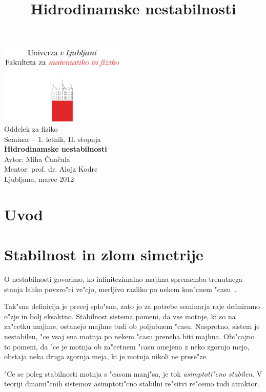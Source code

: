 \documentclass[a4paper,10pt]{article}
\title{Hidrodinamske nestabilnosti}
\begin{document}
\begin{center}
\includegraphics[width=6cm]{../logo_fmf_uni-lj_sl}\\[0.5cm]
Oddelek za fiziko \\[2cm]
{ \large Seminar -- 1. letnik, II. stopnja } \\[1cm]
{ \huge \bf Hidrodinamske nestabilnosti}\\[2cm]
{\large Avtor: Miha \v Can\v cula}\\[0.6cm]
{\large Mentor: prof. dr. Alojz Kodre} \\[0.6cm]
{\large Ljubljana, marec 2012}
\end{center}
\vfill

\begin{abstract}

\end{abstract}

\newpage

\tableofcontents

\section{Uvod}

\section{Stabilnost in zlom simetrije}

O nestabilnosti govorimo, ko infinitezimalno majhna sprememba trenutnega stanja lahko povzro"ci ve"cjo, merljivo razliko po nekem kon"cnem "casu~\cite{drazin}. 

Tak"sna definicija je precej splo"sna, zato jo za potrebe seminarja raje definiramo o"zje in bolj eksaktno. Stabilnost sistema pomeni, da vse motnje, ki so na za"cetku majhne, ostanejo majhne tudi ob poljubnem "casu. Nasprotno, sistem je nestabilen, "ce vsaj ena motnja po nekem "casu preneha biti majhna. Obi"cajno to pomeni, da "ce je motnja ob za"cetnem "casu omejena z neko zgornjo mejo, obstaja neka druga zgornja meja, ki je motnja nikoli ne prese"ze. 

"Ce se poleg stabilnosti motnja s "casom manj"sa, je tok \emph{asimptoti"cno stabilen}. V teoriji dinami"cnih sistemov asimptoti"cno stabilni re"sitvi re"cemo tudi atraktor. 
\end{document}
